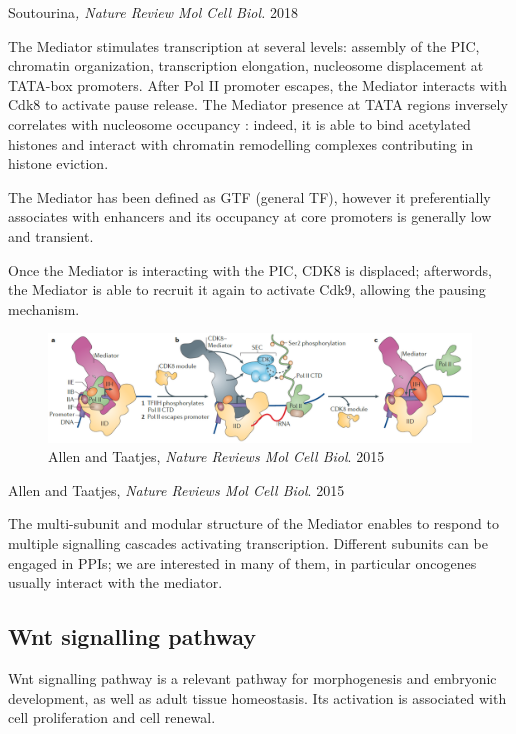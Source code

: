 Soutourina\emph{, Nature Review Mol Cell Biol.} 2018

The Mediator stimulates transcription at several levels: assembly of the PIC, chromatin organization, transcription elongation, nucleosome displacement at TATA-box promoters. After Pol II promoter escapes, the Mediator interacts with Cdk8 to activate pause release. The Mediator presence at TATA regions inversely correlates with nucleosome occupancy : indeed, it is able to bind acetylated histones and interact with chromatin remodelling complexes contributing in histone eviction.

The Mediator has been defined as GTF (general TF), however it preferentially associates with enhancers and its occupancy at core promoters is generally low and transient.

Once the Mediator is interacting with the PIC, CDK8 is displaced; afterwords, the Mediator is able to recruit it again to activate Cdk9, allowing the pausing mechanism.

\begin{figure}
\centering
\includegraphics[width=\textwidth]{../_resources/Screenshot_2022-10-10_at_11-03-13.png}
\caption{Allen and Taatjes, \emph{Nature Reviews Mol Cell Biol}. 2015}
\end{figure}

Allen and Taatjes, \emph{Nature Reviews Mol Cell Biol}. 2015

The multi-subunit and modular structure of the Mediator enables to respond to multiple signalling cascades activating transcription. Different subunits can be engaged in PPIs; we are interested in many of them, in particular oncogenes usually interact with the mediator.

\hypertarget{wnt-signalling-pathway}{%
\subsection{Wnt signalling pathway}\label{wnt-signalling-pathway}}

Wnt signalling pathway is a relevant pathway for morphogenesis and embryonic development, as well as adult tissue homeostasis. Its activation is associated with cell proliferation and cell renewal.

